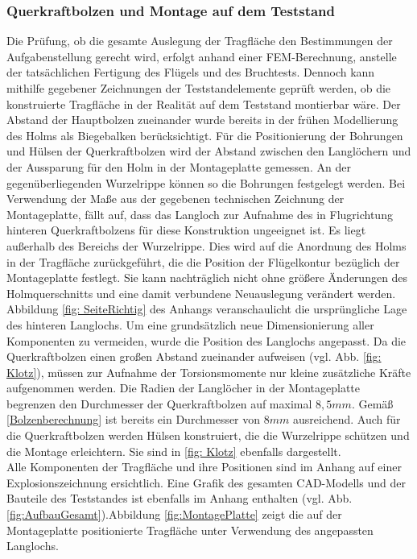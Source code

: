 \subsubsection{Querkraftbolzen und Montage auf dem Teststand}
Die Prüfung, ob die gesamte Auslegung der Tragfläche den Bestimmungen der Aufgabenstellung gerecht wird, erfolgt anhand einer FEM-Berechnung, anstelle der tatsächlichen Fertigung des Flügels und des Bruchtests. Dennoch kann mithilfe gegebener Zeichnungen der Teststandelemente geprüft werden, ob die konstruierte Tragfläche in der Realität auf dem Teststand montierbar wäre. Der Abstand der Hauptbolzen zueinander wurde bereits in der frühen Modellierung des Holms als Biegebalken berücksichtigt. Für die Positionierung der Bohrungen und Hülsen der Querkraftbolzen wird der Abstand zwischen den Langlöchern und der Aussparung für den Holm in der Montageplatte gemessen. An der gegenüberliegenden Wurzelrippe können so die Bohrungen festgelegt werden. Bei Verwendung der Maße aus der gegebenen technischen Zeichnung der Montageplatte, fällt auf, dass das Langloch zur Aufnahme des in Flugrichtung hinteren Querkraftbolzens für diese Konstruktion ungeeignet ist. Es liegt außerhalb des Bereichs der Wurzelrippe. Dies wird auf die Anordnung des Holms in der Tragfläche zurückgeführt, die die Position der Flügelkontur bezüglich der Montageplatte festlegt. Sie kann nachträglich nicht ohne größere Änderungen des Holmquerschnitts und eine damit verbundene Neuauslegung verändert werden. Abbildung \ref{fig: SeiteRichtig} des Anhangs veranschaulicht die ursprüngliche Lage des hinteren Langlochs. Um eine grundsätzlich neue Dimensionierung aller Komponenten zu vermeiden, wurde die Position des Langlochs angepasst. Da die Querkraftbolzen einen großen Abstand zueinander aufweisen (vgl. Abb. \ref{fig: Klotz}), müssen zur Aufnahme der Torsionsmomente nur kleine zusätzliche Kräfte aufgenommen werden. Die Radien der Langlöcher in der Montageplatte begrenzen den Durchmesser der Querkraftbolzen auf maximal $ 8,5mm $. Gemäß \ref{Bolzenberechnung} ist bereits ein Durchmesser von $ 8mm $ ausreichend. Auch für die Querkraftbolzen werden Hülsen konstruiert, die die Wurzelrippe schützen und die Montage erleichtern. Sie sind in \ref{fig: Klotz} ebenfalls dargestellt.\\

\noindent Alle Komponenten der Tragfläche und ihre Positionen sind im Anhang auf einer Explosionszeichnung ersichtlich. Eine Grafik des gesamten CAD-Modells und der Bauteile des Teststandes ist ebenfalls im Anhang enthalten (vgl. Abb. \ref{fig:AufbauGesamt}).Abbildung \ref{fig:MontagePlatte} zeigt die auf der Montageplatte positionierte Tragfläche unter Verwendung des angepassten Langlochs.
